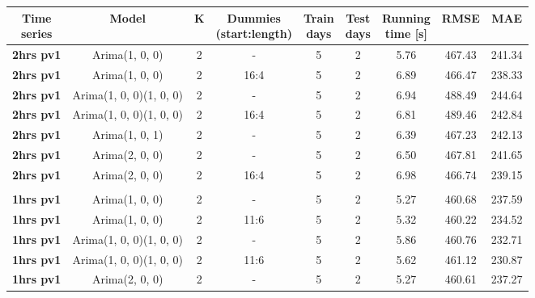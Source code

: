 \documentclass[12pt,a4paper,titlepage]{report}
\begin{document}
\begin{table}[htbp]
    \begin{tabular}{|c|c|c|c|c|c|c|c|c|}
        \hline
        \makecell{\textbf{Time} \\ \textbf{series}} & \textbf{Model}          & \textbf{K} & \makecell{\textbf{Dummies} \\ \textbf{(start:length)}} & \makecell{\textbf{Train} \\ \textbf{days}} & \makecell{\textbf{Test}\\ \textbf{days}} & \makecell{\textbf{Running} \\ \textbf{time {[}s{]}}} & \textbf{RMSE} & \textbf{MAE} \\ \hline
        \textbf{2hrs pv1} & Arima(1, 0, 0)          & 2 & -    & 5 & 2 & 5.76     & 467.43 & 241.34 \\ \hline
        \textbf{2hrs pv1} & Arima(1, 0, 0)          & 2 & 16:4 & 5 & 2 & 6.89     & 466.47 & 238.33 \\ \hline
        \textbf{2hrs pv1} & Arima(1, 0, 0)(1, 0, 0) & 2 & -    & 5 & 2 & 6.94     & 488.49 & 244.64 \\ \hline
        \textbf{2hrs pv1} & Arima(1, 0, 0)(1, 0, 0) & 2 & 16:4 & 5 & 2 & 6.81     & 489.46 & 242.84 \\ \hline
        \textbf{2hrs pv1} & Arima(1, 0, 1)          & 2 & -    & 5 & 2 & 6.39     & 467.23 & 242.13 \\ \hline
        \textbf{2hrs pv1} & Arima(2, 0, 0)          & 2 & -    & 5 & 2 & 6.50     & 467.81 & 241.65 \\ \hline
        \textbf{2hrs pv1} & Arima(2, 0, 0)          & 2 & 16:4 & 5 & 2 & 6.98     & 466.74 & 239.15 \\ \hline
        \textbf{}         &                         &   &      &   &   &          &        &        \\ \hline
        \textbf{1hrs pv1} & Arima(1, 0, 0)          & 2 & -    & 5 & 2 & 5.27     & 460.68 & 237.59 \\ \hline
        \textbf{1hrs pv1} & Arima(1, 0, 0)          & 2 & 11:6 & 5 & 2 & 5.32     & 460.22 & 234.52 \\ \hline
        \textbf{1hrs pv1} & Arima(1, 0, 0)(1, 0, 0) & 2 & -    & 5 & 2 & 5.86     & 460.76 & 232.71 \\ \hline
        \textbf{1hrs pv1} & Arima(1, 0, 0)(1, 0, 0) & 2 & 11:6 & 5 & 2 & 5.62     & 461.12 & 230.87 \\ \hline
        \textbf{1hrs pv1} & Arima(2, 0, 0)          & 2 & -    & 5 & 2 & 5.27     & 460.61 & 237.27 \\ \hline

\end{tabular}
\end{table}
\end{document}
